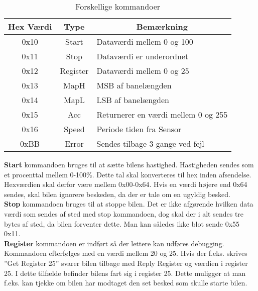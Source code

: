 \begin{table}[h]
\center
\begin{tabular}{|c|c|l|}
\hline
Hex Værdi & Type     &  \multicolumn{1}{c|}{Bemærkning}                                     \\ \hline
0x10      & Start    & Dataværdi mellem 0 og 100                      \\ \hline
0x11      & Stop     & Dataværdi er underordnet                       \\ \hline
0x12      & Register & Dataværdi mellem 0 og 25                       \\ \hline
0x13      & MapH     & MSB af banelængden                             \\ \hline
0x14      & MapL     & LSB af banelængden                             \\ \hline
0x15      & Acc      & Returnerer en værdi mellem 0 og 255            \\ \hline
0x16      & Speed    & Periode tiden fra Sensor                       \\ \hline
0xBB      & Error    & Sendes tilbage 3 gange ved fejl                \\ \hline
\end{tabular}
\caption{Forskellige kommandoer}
\label{forskel_kommando}
\end{table}

\textbf{Start} kommandoen bruges til at sætte bilens hastighed. Hastigheden sendes som et procenttal mellem 0-100\%. Dette tal skal konverteres til hex inden afsendelse. Hexværdien skal derfor være mellem 0x00-0x64. Hvis en værdi højere end 0x64 sendes, skal bilen ignorere beskeden, da der er tale om en ugyldig besked. \\

\textbf{Stop} kommandoen bruges til at stoppe bilen. Det er ikke afgørende hvilken data værdi som sendes af sted med stop kommandoen, dog skal der i alt sendes tre bytes af sted, da bilen forventer dette. Man kan således ikke blot sende 0x55 0x11. \\ 

\textbf{Register} kommandoen er indført så der lettere kan udføres debugging. Kommandoen efterfølges med en værdi mellem 20 og 25. Hvis der f.eks. skrives ”Get Register 25” svarer bilen tilbage med Reply Register og værdien i register 25. I dette tilfælde befinder bilens fart sig i register 25. Dette muliggør at man f.eks. kan tjekke om bilen har modtaget den set besked som skulle starte bilen. \\

